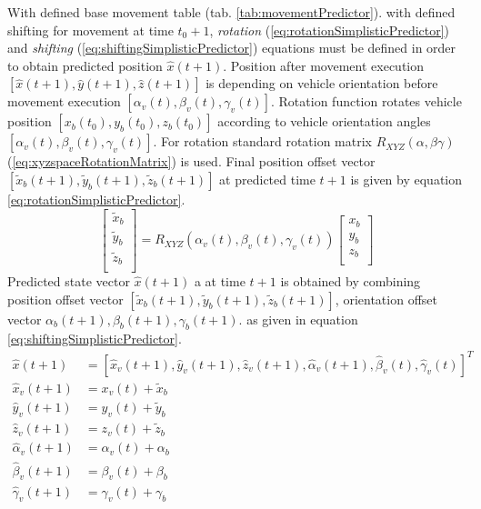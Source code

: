 \noindent With defined base movement table (tab. \ref{tab:movementPredictor}). with defined shifting for movement at time $t_0+1$, \textit{rotation} (\ref{eq:rotationSimplisticPredictor}) and \textit{shifting} (\ref{eq:shiftingSimplisticPredictor}) equations must be defined in order to obtain predicted position $\hat{x}(t+1)$. Position after movement execution $[\hat{x}(t+1),\hat{y}(t+1),\hat{z}(t+1)]$ is depending on vehicle orientation before movement execution $[\alpha_v(t),\beta_v(t),\gamma_v(t)]$. Rotation function rotates vehicle position $[x_b(t_0),y_b(t_0),z_b(t_0)]$ according to vehicle orientation angles $[\alpha_v(t),\beta_v(t),\gamma_v(t)]$. For rotation standard rotation matrix $R_{XYZ}(\alpha,\beta\gamma)$ (\ref{eq:xyzspaceRotationMatrix}) is used. Final position offset vector $[\tilde{x}_b(t+1),\tilde{y}_b(t+1),\tilde{z}_b(t+1)]$ at predicted time $t+1$ is given by equation \ref{eq:rotationSimplisticPredictor}.
\begin{equation}\label{eq:rotationSimplisticPredictor}
    \begin{bmatrix}
        \tilde{x}_b\\ 
        \tilde{y}_b\\
        \tilde{z}_b\\
    \end{bmatrix}
    = R_{XYZ}(\alpha_v(t),\beta_v(t),\gamma_v(t))
    \begin{bmatrix}
        x_b\\ 
        y_b\\
        z_b\\
    \end{bmatrix}
\end{equation}
Predicted state vector $\hat{x}(t+1)$ a at time $t+1$ is obtained by combining position offset vector $[\tilde{x}_b(t+1),\tilde{y}_b(t+1),\tilde{z}_b(t+1)]$, orientation offset vector $\alpha_b(t+1),\beta_b(t+1),\gamma_b(t+1)$. as given in equation \ref{eq:shiftingSimplisticPredictor}.\\
\begin{equation}\label{eq:shiftingSimplisticPredictor}
    \begin{aligned}
    \hat{x}(t+1) & = [\hat{x}_v(t+1),\hat{y}_v(t+1),\hat{z}_v(t+1),\hat{\alpha}_v(t+1),\hat{\beta}_v(t),\hat{\gamma}_v(t)]^T\\
    \hat{x}_v(t+1) & = x_v(t)+\tilde{x}_b\\
    \hat{y}_v(t+1) & = y_v(t)+\tilde{y}_b\\
    \hat{z}_v(t+1) & = z_v(t)+\tilde{z}_b\\
    \hat{\alpha}_v(t+1) & = \alpha_v(t) + \alpha_b\\
    \hat{\beta}_v(t+1) & = \beta_v(t) + \beta_b\\
    \hat{\gamma}_v(t+1) & = \gamma_v(t) + \gamma_b
    \end{aligned}
\end{equation}
